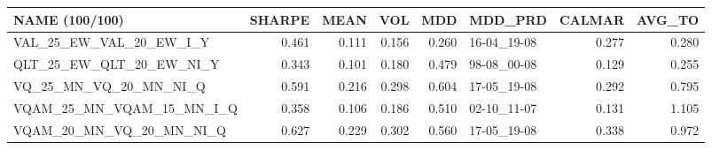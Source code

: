 \begin{tabular}{lrrrrlrr}
\toprule
NAME (100/100) & SHARPE & MEAN & VOL & MDD & MDD\_PRD & CALMAR & AVG\_TO \\
\midrule
VAL\_25\_EW\_VAL\_20\_EW\_I\_Y & 0.461 & 0.111 & 0.156 & 0.260 & 16-04\_19-08 & 0.277 & 0.280 \\
QLT\_25\_EW\_QLT\_20\_EW\_NI\_Y & 0.343 & 0.101 & 0.180 & 0.479 & 98-08\_00-08 & 0.129 & 0.255 \\
VQ\_25\_MN\_VQ\_20\_MN\_NI\_Q & 0.591 & 0.216 & 0.298 & 0.604 & 17-05\_19-08 & 0.292 & 0.795 \\
VQAM\_25\_MN\_VQAM\_15\_MN\_I\_Q & 0.358 & 0.106 & 0.186 & 0.510 & 02-10\_11-07 & 0.131 & 1.105 \\
VQAM\_20\_MN\_VQ\_20\_MN\_NI\_Q & 0.627 & 0.229 & 0.302 & 0.560 & 17-05\_19-08 & 0.338 & 0.972 \\
\bottomrule
\end{tabular}
